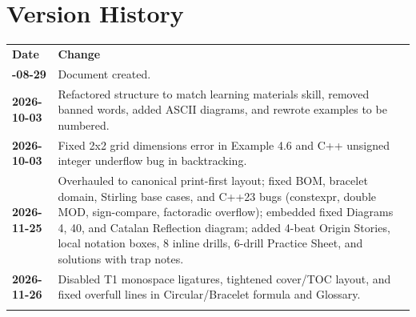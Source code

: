 \documentclass[11pt,a4paper]{article}
\theoremstyle{definition}
\begin{document}
\section*{Version History}

\begin{center}
\begingroup
\small
{}
\begin{tabularx}{\textwidth}{>{\bfseries}l >{\raggedright\arraybackslash}X}
\arrayrulecolor{primaryblue}\toprule[1.2pt]
\rowcolor{primaryblue!10}
\textcolor{primaryblue}{\textbf{Date}} & \textcolor{primaryblue}{\textbf{Change}} \\
\arrayrulecolor{codeframe}\midrule[0.6pt]
2026-08-29 & Document created. \\
2026-10-03 & Refactored structure to match learning materials skill, removed banned words, added ASCII diagrams, and rewrote examples to be numbered. \\
2026-10-03 & Fixed 2x2 grid dimensions error in Example 4.6 and C++ unsigned integer underflow bug in backtracking. \\
2026-11-25 & Overhauled to canonical print-first layout; fixed BOM, bracelet domain, Stirling base cases, and C++23 bugs (constexpr, double MOD, sign-compare, factoradic overflow); embedded fixed Diagrams 4, 40, and Catalan Reflection diagram; added 4-beat Origin Stories, local notation boxes, 8 inline drills, 6-drill Practice Sheet, and solutions with trap notes. \\
2026-11-26 & Disabled T1 monospace ligatures, tightened cover/TOC layout, and fixed overfull lines in Circular/Bracelet formula and Glossary. \\
\arrayrulecolor{primaryblue}\bottomrule[1.2pt]
\end{tabularx}
\endgroup
\end{center}
\end{document}
